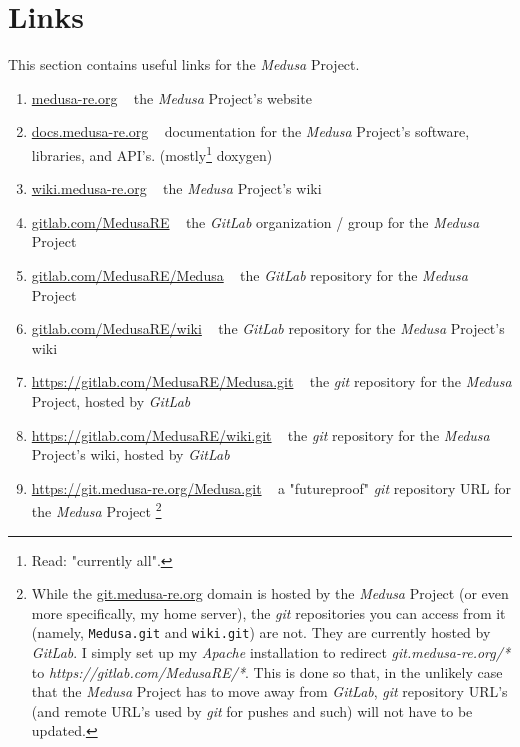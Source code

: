 \documentclass{article}
\newcommand{\Medusa}{\textit{Medusa}\xspace}
\begin{document}
	\section{Links}
	This section contains useful links for the \Medusa Project.
	\begin{enumerate}
		\item \href{https://www.medusa-re.org}{medusa-re.org} ~ the \Medusa
		Project's website

		\item \href{https://docs.medusa-re.org}{docs.medusa-re.org} ~
		documentation for the \Medusa Project's software, libraries, and API's.
		(mostly\footnote{Read: "currently all".} doxygen)

		\item \href{https://wiki.medusa-re.org}{wiki.medusa-re.org} ~ the
		\Medusa Project's wiki

		\item \href{https://www.gitlab.com/MedusaRE}{gitlab.com/MedusaRE}
		~ the \textit{GitLab} organization / group for the \Medusa Project

		\item \href{https://www.gitlab.com/MedusaRE/Medusa}{gitlab.com/MedusaRE/Medusa}
		~ the \textit{GitLab} repository for the \Medusa Project

		\item \href{https://www.gitlab.com/MedusaRE/wiki}{gitlab.com/MedusaRE/wiki}
		~ the \textit{GitLab} repository for the \Medusa Project's wiki

		\item \href{https://www.gitlab.com/MedusaRE/Medusa.git}{https://gitlab.com/MedusaRE/Medusa.git}
		~ the \textit{git} repository for the \Medusa Project, hosted by
		\textit{GitLab}

		\item \href{https://www.gitlab.com/MedusaRE/wiki.git}{https://gitlab.com/MedusaRE/wiki.git}
		~ the \textit{git} repository for the \Medusa Project's wiki, hosted by
		\textit{GitLab}

		\item \href{https://git.medusa-re.org/Medusa.git}{https://git.medusa-re.org/Medusa.git}
		~ a "futureproof" \textit{git} repository URL for the \Medusa Project
		\footnote{
			\label{git_note}
			While the \href{https://git.medusa-re.org}{git.medusa-re.org} domain
			is hosted by the \Medusa Project (or even more specifically, my
			home server), the \textit{git} repositories you can access from it
			(namely, \texttt{Medusa.git} and \texttt{wiki.git}) are not. They
			are currently hosted by \textit{GitLab}. I simply set up my
			\textit{Apache} installation to redirect
			\textit{git.medusa-re.org/*} to
			\textit{https://gitlab.com/MedusaRE/*}. This is done so that, in the
			unlikely case that the \Medusa Project has to move away from
			\textit{GitLab}, \textit{git} repository URL's (and remote URL's
			used by \textit{git} for pushes and such) will not have to be
			updated.
		}


\end{enumerate}
\end{document}
